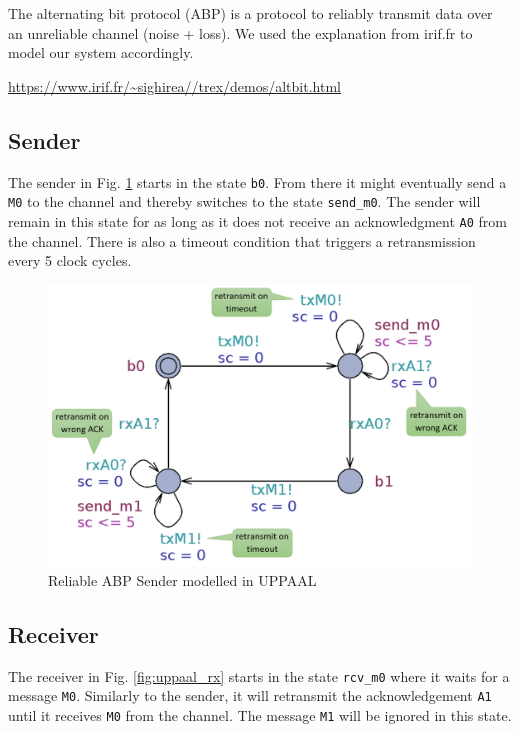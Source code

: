 \documentclass[10pt,bibliography=totocnumbered,listof=totocnumbered, footsepline, headsepline]{scrreprt}
\begin{document}
The alternating bit protocol (ABP) is a protocol to reliably transmit data over an unreliable channel (noise + loss). We used the explanation from irif.fr to model our system accordingly.

\url{https://www.irif.fr/~sighirea//trex/demos/altbit.html}

\subsection{Sender}

The sender in Fig. \ref{fig:uppaal_tx} starts in the state \texttt{b0}. From there it might eventually send a \texttt{M0} to the channel and thereby switches to the state \texttt{send\_m0}.
The sender will remain in this state for as long as it does not receive an acknowledgment \texttt{A0} from the channel. There is also a timeout condition that triggers a retransmission every 5 clock cycles.

\begin{figure}[H]
	\centerline{\includegraphics[width=38pc]{uppaal_tx.png}}
	\caption{Reliable ABP Sender modelled in UPPAAL}
	\label{fig:uppaal_tx}
\end{figure}

\subsection{Receiver}

The receiver in Fig. \ref{fig:uppaal_rx} starts in the state \texttt{rcv\_m0} where it waits for a message \texttt{M0}. Similarly to the sender, it will retransmit the acknowledgement \texttt{A1} until it receives \texttt{M0} from the channel. The message \texttt{M1} will be ignored in this state.
\end{document}
